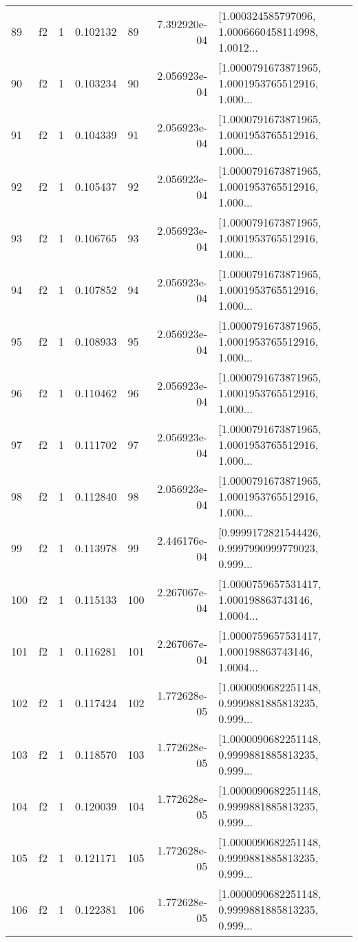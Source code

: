 \begin{tabular}{lllrlrl}
89  &  f2 &   1 &  0.102132 &   89 &  7.392920e-04 &  [1.000324585797096, 1.0006660458114998, 1.0012... \\
90  &  f2 &   1 &  0.103234 &   90 &  2.056923e-04 &  [1.0000791673871965, 1.0001953765512916, 1.000... \\
91  &  f2 &   1 &  0.104339 &   91 &  2.056923e-04 &  [1.0000791673871965, 1.0001953765512916, 1.000... \\
92  &  f2 &   1 &  0.105437 &   92 &  2.056923e-04 &  [1.0000791673871965, 1.0001953765512916, 1.000... \\
93  &  f2 &   1 &  0.106765 &   93 &  2.056923e-04 &  [1.0000791673871965, 1.0001953765512916, 1.000... \\
94  &  f2 &   1 &  0.107852 &   94 &  2.056923e-04 &  [1.0000791673871965, 1.0001953765512916, 1.000... \\
95  &  f2 &   1 &  0.108933 &   95 &  2.056923e-04 &  [1.0000791673871965, 1.0001953765512916, 1.000... \\
96  &  f2 &   1 &  0.110462 &   96 &  2.056923e-04 &  [1.0000791673871965, 1.0001953765512916, 1.000... \\
97  &  f2 &   1 &  0.111702 &   97 &  2.056923e-04 &  [1.0000791673871965, 1.0001953765512916, 1.000... \\
98  &  f2 &   1 &  0.112840 &   98 &  2.056923e-04 &  [1.0000791673871965, 1.0001953765512916, 1.000... \\
99  &  f2 &   1 &  0.113978 &   99 &  2.446176e-04 &  [0.9999172821544426, 0.9997990999779023, 0.999... \\
100 &  f2 &   1 &  0.115133 &  100 &  2.267067e-04 &  [1.0000759657531417, 1.000198863743146, 1.0004... \\
101 &  f2 &   1 &  0.116281 &  101 &  2.267067e-04 &  [1.0000759657531417, 1.000198863743146, 1.0004... \\
102 &  f2 &   1 &  0.117424 &  102 &  1.772628e-05 &  [1.0000090682251148, 0.9999881885813235, 0.999... \\
103 &  f2 &   1 &  0.118570 &  103 &  1.772628e-05 &  [1.0000090682251148, 0.9999881885813235, 0.999... \\
104 &  f2 &   1 &  0.120039 &  104 &  1.772628e-05 &  [1.0000090682251148, 0.9999881885813235, 0.999... \\
105 &  f2 &   1 &  0.121171 &  105 &  1.772628e-05 &  [1.0000090682251148, 0.9999881885813235, 0.999... \\
106 &  f2 &   1 &  0.122381 &  106 &  1.772628e-05 &  [1.0000090682251148, 0.9999881885813235, 0.999... \\

\end{tabular}
